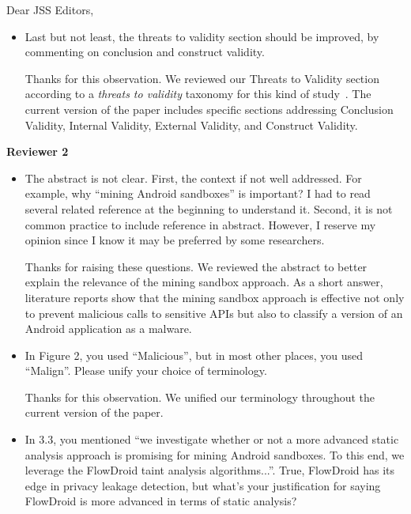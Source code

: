 \documentclass[12pt,english]{scrartcl}
\begin{document}
\begin{letter}{Dear JSS Editors,}
\begin{itemize}
\item Last but not least, the threats to validity section should be improved, by commenting on conclusion and construct validity.


\vspace{0.2cm}

{\color{blue}{\bf Answer.} Thanks for this observation. We reviewed our Threats to Validity section according to
  a \emph{threats to validity} taxonomy for this kind of study~\cite{10.5555/2349018}. The current version
  of the paper includes specific sections addressing Conclusion Validity, Internal Validity, External
Validity, and Construct Validity.}


\end{itemize}

{\bf Reviewer 2}

\begin{itemize}

\item The abstract is not clear. First, the context if not well addressed.
  For example, why ``mining Android sandboxes'' is important? I had to read
  several related reference at the beginning to understand it. Second, it is not common practice to 
include reference in abstract. However, I reserve my opinion since I know it may be preferred by some researchers.


\vspace{0.2cm}

{\color{blue}{\bf Answer.} Thanks for raising these questions. We reviewed the abstract
  to better explain the relevance of the mining sandbox approach. As a short answer,
  literature reports show that the mining sandbox approach is effective  not only to prevent malicious
  calls to sensitive APIs but also to classify a version of an Android application as a malware.}

\vspace{0.2cm}

\item In Figure 2, you used ``Malicious'', but in most other places, you used ``Malign''.
  Please unify your choice of terminology.


\vspace{0.2cm}

{\color{blue}{\bf Answer.} Thanks for this observation. We unified our terminology throughout the current
  version of the paper.}

\vspace{0.2cm}

\item In 3.3, you mentioned ``we investigate whether or not a more advanced static analysis approach is promising for mining 
Android sandboxes. To this end, we leverage the FlowDroid taint analysis algorithms...''. True, FlowDroid has its edge 
in privacy leakage detection, but what's your justification for saying FlowDroid is more advanced in terms of static analysis?



\end{itemize}
\end{letter}
\end{document}
